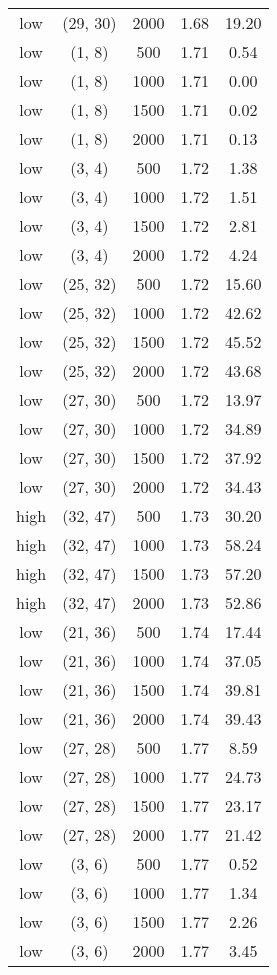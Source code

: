 \begin{tabular}{c c c c c}
low & (29, 30) &  2000 & 1.68 & 19.20 \\
low & (1, 8) &  500 & 1.71 & 0.54 \\
low & (1, 8) &  1000 & 1.71 & 0.00 \\
low & (1, 8) &  1500 & 1.71 & 0.02 \\
low & (1, 8) &  2000 & 1.71 & 0.13 \\
low & (3, 4) &  500 & 1.72 & 1.38 \\
low & (3, 4) &  1000 & 1.72 & 1.51 \\
low & (3, 4) &  1500 & 1.72 & 2.81 \\
low & (3, 4) &  2000 & 1.72 & 4.24 \\
low & (25, 32) &  500 & 1.72 & 15.60 \\
low & (25, 32) &  1000 & 1.72 & 42.62 \\
low & (25, 32) &  1500 & 1.72 & 45.52 \\
low & (25, 32) &  2000 & 1.72 & 43.68 \\
low & (27, 30) &  500 & 1.72 & 13.97 \\
low & (27, 30) &  1000 & 1.72 & 34.89 \\
low & (27, 30) &  1500 & 1.72 & 37.92 \\
low & (27, 30) &  2000 & 1.72 & 34.43 \\
high & (32, 47) &  500 & 1.73 & 30.20 \\
high & (32, 47) &  1000 & 1.73 & 58.24 \\
high & (32, 47) &  1500 & 1.73 & 57.20 \\
high & (32, 47) &  2000 & 1.73 & 52.86 \\
low & (21, 36) &  500 & 1.74 & 17.44 \\
low & (21, 36) &  1000 & 1.74 & 37.05 \\
low & (21, 36) &  1500 & 1.74 & 39.81 \\
low & (21, 36) &  2000 & 1.74 & 39.43 \\
low & (27, 28) &  500 & 1.77 & 8.59 \\
low & (27, 28) &  1000 & 1.77 & 24.73 \\
low & (27, 28) &  1500 & 1.77 & 23.17 \\
low & (27, 28) &  2000 & 1.77 & 21.42 \\
low & (3, 6) &  500 & 1.77 & 0.52 \\
low & (3, 6) &  1000 & 1.77 & 1.34 \\
low & (3, 6) &  1500 & 1.77 & 2.26 \\
low & (3, 6) &  2000 & 1.77 & 3.45 \\

\end{tabular}
